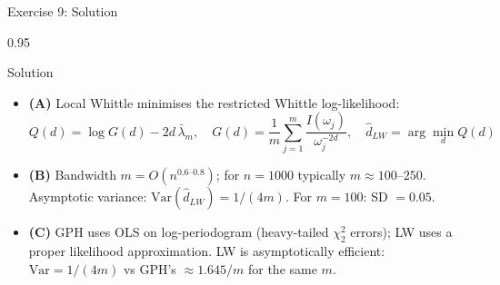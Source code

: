 \documentclass[9pt, aspectratio=169, t]{beamer}
\begin{document}
\begin{frame}{Exercise 9: Solution}
    \begin{cminipage}{0.95\textwidth}
    \begin{exampleblock}{Solution}
        {\footnotesize
        \begin{itemize}\setlength{\itemsep}{3pt}
            \item \textcolor{MainBlue}{\textbf{(A)}} Local Whittle minimises the restricted Whittle log-likelihood:
                \[
                    Q(d) = \log G(d) - 2d\,\bar{\lambda}_m, \quad G(d) = \frac{1}{m}\sum_{j=1}^{m}\frac{I(\omega_j)}{\omega_j^{-2d}}, \quad \hat{d}_{LW} = \arg\min_d Q(d)
                \]
            \item \textcolor{MainBlue}{\textbf{(B)}} Bandwidth $m=O(n^{0.6\text{--}0.8})$; for $n=1000$ typically $m\approx 100$--$250$. Asymptotic variance: $\text{Var}(\hat{d}_{LW})=1/(4m)$. For $m=100$: SD $=0.05$.
            \item \textcolor{MainBlue}{\textbf{(C)}} GPH uses OLS on log-periodogram (heavy-tailed $\chi^2_2$ errors); LW uses a proper likelihood approximation. LW is asymptotically efficient: $\text{Var}=1/(4m)$ vs GPH's $\approx 1.645/m$ for the same $m$.
        \end{itemize}
        }
    \end{exampleblock}
    \end{cminipage}
\end{frame}
\end{document}
